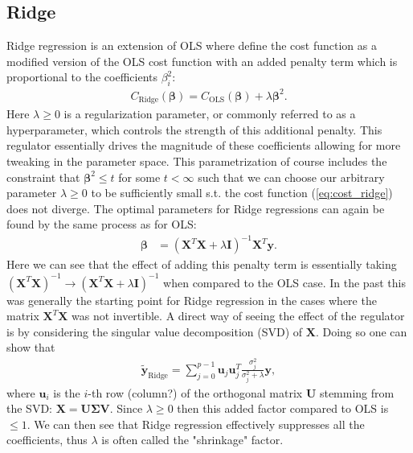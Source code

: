 \documentclass[%
reprint,
amsmath,amssymb,
aps,
pra,
]{revtex4-2}
\begin{document}
\subsection{Ridge}	\label{sec:THEORY_Ridge}
Ridge regression is an extension of OLS where define the cost function as a modified version of the OLS cost function with an added penalty term which is proportional to the coefficients $\beta_i^2$:
\begin{align}
	C_\text{Ridge}(\bm\beta)=C_\text{OLS}(\bm\beta)+\lambda\bm\beta^2.
	\label{eq:cost_ridge}
\end{align}
Here $\lambda\geq0$ is a regularization parameter, or commonly referred to as a hyperparameter, which controls the strength of this additional penalty. This regulator essentially drives the magnitude of these coefficients allowing for more tweaking in the parameter space. This parametrization of course includes the constraint that $\bm{\beta}^2\leq t$ for some $t<\infty$ such that we can choose our arbitrary parameter $\lambda\geq0$ to be sufficiently small s.t. the cost function (\ref{eq:cost_ridge}) does not diverge. The optimal parameters for Ridge regressions can again be found by the same process as for OLS:
\begin{align}
	\bm{\beta}&=(\bm{X}^T\bm{X}+\lambda\bm{I})^{-1}\bm{X}^T\bm{y}.
	\label{eq:beta_ridge}
\end{align}
Here we can see that the effect of adding this penalty term is essentially taking $(\bm X^T\bm X)^{-1}\to(\bm X^T\bm X+\lambda\bm I)^{-1}$ when compared to the OLS case. In the past this was generally the starting point for Ridge regression in the cases where the matrix $\bm X^T\bm X$ was not invertible. A direct way of seeing the effect of the regulator is by considering the singular value decomposition (SVD) of $\bm X$. Doing so one can show that 
\begin{align}
	\tilde{\bm{y}}_\text{Ridge}=\sum_{j=0}^{p-1}\bm{u}_j\bm{u}_j^T\frac{\sigma_j^2}{\sigma_j^2+\lambda}\bm{y},
	\label{eq:svd_ridge}
\end{align}
where $\bm u_i$ is the $i$-th row (column?) of the orthogonal matrix $\bm U$ stemming from the SVD: $\bm X=\bm U\bm \Sigma\bm V$. Since $\lambda\geq0$ then this added factor compared to OLS is $\leq1$. We can then see that Ridge regression effectively suppresses all the coefficients, thus $\lambda$ is often called the "shrinkage" factor. 
\end{document}
